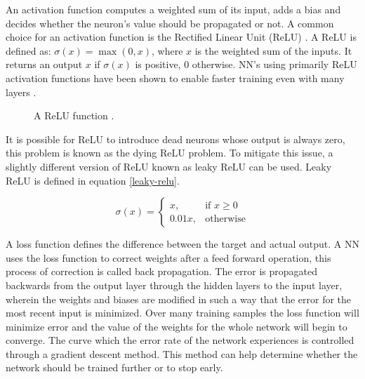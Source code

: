 An activation function computes a weighted sum of its input, adds a bias and decides whether the neuron's value should be propagated or not. A common choice for an activation function is the Rectified Linear Unit (ReLU) \cite{Relu}. A ReLU is defined as: $\sigma(x) = \max(0, x)$, where $x$ is the weighted sum of the inputs. It returns an output $x$ if $\sigma(x)$ is positive, $0$ otherwise. NN's using primarily ReLU activation functions have been shown to enable faster training even with many layers \cite{cnn-star-galaxy}.

\begin{figure}\label{fig:relu}
\centering
{}
\caption{A ReLU function \cite{reluimage}.}
\end{figure}

It is possible for ReLU to introduce dead neurons whose output is always zero, this problem is known as the dying ReLU problem. To mitigate this issue, a slightly different version of ReLU known as leaky ReLU can be used. Leaky ReLU is defined in equation \ref{leaky-relu}.

\begin{equation}
\sigma(x) =
\begin{cases} \label{leaky-relu}
    x      , & \text{if } x\geq 0\\
    0.01x , & \text{otherwise}
\end{cases}
\end{equation}

A loss function defines the difference between the target and actual output\cite{Engelbrecht}. A NN uses the loss function to correct weights after a feed forward operation, this process of correction is called back propagation. The error is propagated backwards from the output layer through the hidden layers to the input layer, wherein the weights and biases are modified in such a way that the error for the most recent input is minimized. Over many training samples the loss function will minimize error and the value of the weights for the whole network will begin to converge. The curve which the error rate of the network experiences is controlled through a gradient descent method. This method can help determine whether the network should be trained further or to stop early.

